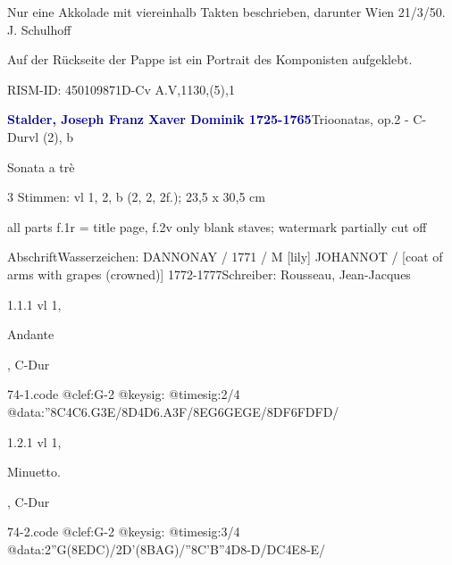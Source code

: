 \documentclass[a4paper, twocolumn, 11pt]{book}
\begin{document}
\newline %
\par Nur eine Akkolade mit viereinhalb Takten beschrieben, darunter {\textquotedbl}Wien 21/3/50. J. Schulhoff{\textquotedbl}
\par Auf der Rückseite der Pappe ist ein Portrait des Komponisten aufgeklebt.
\par RISM-ID: 450109871\newline D-Cv  A.V,1130,(5),1
\par \vspace{16pt} \textcolor{darkblue}{\textbf{Stalder, Joseph Franz Xaver Dominik  1725-1765}}\hfillplus{[74]}\newline Trioonatas, op.2 - C-Dur\newline vl (2), b
\par \begin{itshape} Sonata a trè\end{itshape} 
\par \textcolor{darkblue}{}  3 Stimmen: vl 1, 2, b  (2, 2, 2f.); 23,5 x 30,5 cm\newline \begin{small} all parts f.1r = title page, f.2v only blank staves; watermark partially cut off\end{small} \newline Abschrift\newline Wasserzeichen: DANNONAY / 1771 / M [lily] JOHANNOT / [coat of arms with grapes (crowned)]  1772-1777\newline Schreiber: Rousseau, Jean-Jacques
\par 1.1.1  vl 1, \begin{itshape}Andante\end{itshape}, C-Dur  
\begin{filecontents*}{74-1.code}
@clef:G-2
@keysig:
@timesig:2/4
@data:''8C4C{6.G3E}/8D4D{6.A3F}/{8EG}{6GEGE}/{8DF}{6FDFD}/
\end{filecontents*}

\newline %
\par 1.2.1  vl 1, \begin{itshape}Minuetto.\end{itshape}, C-Dur  
\begin{filecontents*}{74-2.code}
@clef:G-2
@keysig:
@timesig:3/4
@data:2''G(8{EDC})/2D'({8BAG})/''{8C'B}''4D8-D/{DC}4E8-E/
\end{filecontents*}
\end{document}
